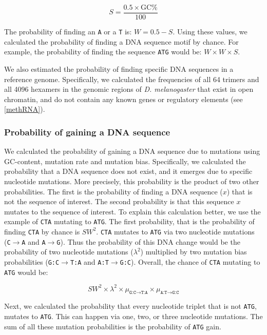 \documentclass[12pt,a4paper]{article}
\newcommand{\cmnt}[1]{{\color{purple} #1}}
\begin{document}
$$S = \frac{0.5\times\text{GC\%}}{100}$$

The probability of finding an \texttt{A} or a \texttt{T} is: $W = 0.5 - S$. Using these values, we calculated the probability of finding a DNA sequence motif by chance. For example, the probability of finding the sequence \texttt{ATG} would be: $W\times W \times S$.

\cmnt{We also estimated the probability of finding specific DNA sequences in a reference genome. Specifically, we calculated the frequencies of all 64 trimers and all 4096 hexamers in the genomic regions of \textit{D. melanogaster} that exist in open chromatin, and do not contain any known genes or regulatory elements (see \autoref{methRNA})}.

\subsubsection{Probability of gaining a DNA sequence}
\label{methgain}

We calculated the probability of gaining a DNA sequence due to mutations using GC-content, mutation rate and mutation bias. Specifically, we calculated the probability that a DNA sequence does not exist, and it emerges due to specific nucleotide mutations. More precisely, this probability is the product of two other probabilities. The first is the probability of finding a DNA sequence ($x$) that is not the sequence of interest. The second probability is that this sequence $x$ mutates to the sequence of interest. To explain this calculation better, we use the example of \texttt{CTA} mutating to \texttt{ATG}. The first probability, that is the probability of finding \texttt{CTA} by chance is $SW^2$. \texttt{CTA} mutates to \texttt{ATG} via two nucleotide mutations (\texttt{C}$\to$\texttt{A} and \texttt{A}$\to$\texttt{G}). Thus the probability of this DNA change would be the probability of two nucleotide mutations ($\lambda^2$) multiplied by two mutation bias probabilities (\texttt{G:C}$\to$\texttt{T:A} and \texttt{A:T}$\to$\texttt{G:C}). Overall, the chance of \texttt{CTA} mutating to \texttt{ATG} would be:

$$SW^2 \times \lambda^2 \times \mu_{\texttt{G:C}\to\texttt{T:A}} \times \mu_{\texttt{A:T}\to\texttt{G:C}}$$

Next, we calculated the probability that every nucleotide triplet that is not \texttt{ATG}, mutates to \texttt{ATG}. This can happen via one, two, or three nucleotide mutations. The sum of all these mutation probabilities is the probability of \texttt{ATG} gain.
\end{document}
